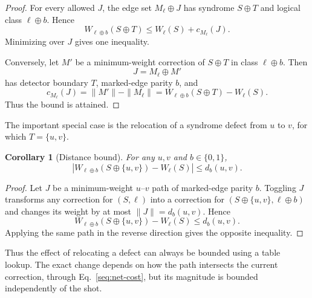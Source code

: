\documentclass[
    reprint,
    amsmath,amssymb,
    nofootinbib,
    superscriptaddress,
    aps,
    noeprint,
    longbibliography,
    prl
]{revtex4-2}
\theoremstyle{plain}
\newtheorem{corollary}[theorem]{Corollary}
\begin{document}
\begin{proof}
    For every allowed $J$, the edge set $M_\ell\oplus J$ has syndrome $S\oplus T$ and logical class
    $\ell\oplus b$. Hence
    \begin{equation}
        W_{\ell\oplus b}(S\oplus T)
        \leq
        W_\ell(S)+c_{M_\ell}(J).
    \end{equation}
    Minimizing over $J$ gives one inequality.

    Conversely, let $M'$ be a minimum-weight correction of $S\oplus T$ in class $\ell\oplus b$. Then
    \begin{equation}
        J=M_\ell\oplus M'
    \end{equation}
    has detector boundary $T$, marked-edge parity $b$, and
    \begin{equation}
        c_{M_\ell}(J)
        =
        \|M'\|-\|M_\ell\|
        =
        W_{\ell\oplus b}(S\oplus T)-W_\ell(S).
    \end{equation}
    Thus the bound is attained.
\end{proof}

The important special case is the relocation of a syndrome defect from $u$ to $v$, for which
$T=\{u,v\}$.

\begin{corollary}[Distance bound]
    \label{slem:distance-bound}
    For any $u,v$ and $b\in\{0,1\}$,
    \begin{equation}
        \left|
        W_{\ell\oplus b}(S\oplus\{u,v\})
        -
        W_\ell(S)
        \right|
        \leq
        d_b(u,v).
        \label{seq:distance-bound}
    \end{equation}
\end{corollary}

\begin{proof}
    Let $J$ be a minimum-weight $u$--$v$ path of marked-edge parity $b$. Toggling $J$ transforms any
    correction for $(S,\ell)$ into a correction for $(S\oplus\{u,v\},\ell\oplus b)$ and changes its
    weight by at most $\|J\|=d_b(u,v)$. Hence
    \begin{equation}
        W_{\ell\oplus b}(S\oplus\{u,v\})
        -
        W_\ell(S)
        \leq d_b(u,v).
    \end{equation}
    Applying the same path in the reverse direction gives the opposite inequality.
\end{proof}

Thus the effect of relocating a defect can always be bounded using a table lookup. The exact change
depends on how the path intersects the current correction, through Eq.~\eqref{seq:net-cost}, but its
magnitude is bounded independently of the shot.
\end{document}
